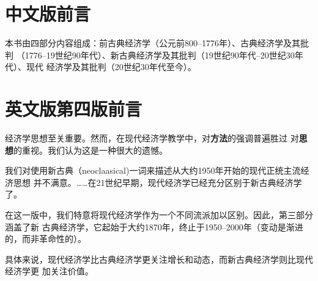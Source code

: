 \chapter{中文版前言}

本书由四部分内容组成：前古典经济学（公元前800--1776年）、古典经济学及其批判
（1776--19世纪90年代）、新古典经济学及其批判（19世纪90年代--20世纪30年代）、现代
经济学及其批判（20世纪30年代至今）。

\chapter{英文版第四版前言}

经济学思想至关重要。然而，在现代经济学教学中，对\textbf{方法}的强调普遍胜过
对\textbf{思想}的重视。我们认为这是一种很大的遗憾。

我们对使用新古典（neoclaasical)一词来描述从大约1950年开始的现代正统主流经济思想
并不满意。……在21世纪早期，现代经济学已经充分区别于新古典经济学了。

在这一版中，我们特意将现代经济学作为一个不同流派加以区别。因此，第三部分涵盖了新
古典经济学，它起始于大约1870年，终止于1950--2000年（变动是渐进的，而非革命性的）。

具体来说，现代经济学比古典经济学更关注增长和动态，而新古典经济学则比现代经济学更
加关注价值。
